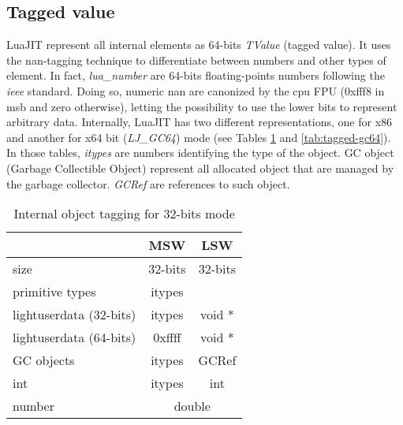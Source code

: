 

\subsection{Tagged value}
\label{Subsec:tagged-value}

LuaJIT represent all internal elements as 64-bits \emph{TValue} (tagged value).
It uses the nan-tagging technique to differentiate between numbers and other
types of element. In fact, \emph{lua\_number} are 64-bits floating-points numbers
following the \emph{ieee} standard. Doing so, numeric nan are canonized by the
cpu FPU (0xfff8 in msb and zero otherwise), letting the possibility to use the
lower bits to represent arbitrary data. Internally, LuaJIT has two different
representations, one for x86 and another for x64 bit (\emph{LJ\_GC64}) mode
(see Tables \ref{tab:tagged-gc32} and \ref{tab:tagged-gc64}). In those tables,
\emph{itypes} are numbers identifying the type of the object.
GC object (Garbage Collectible Object) represent all allocated object
that are managed by the garbage collector. \emph{GCRef} are references to such
object.

\begin{table}[H]
\centering
\caption{Internal object tagging for 32-bits mode}
\label{tab:tagged-gc32}
\begin{tabular}{l|c|c|c|}
\cline{2-4}
                                              & \multicolumn{2}{c|}{MSW}         & LSW         \\ \hline
\multicolumn{1}{|l|}{size}                    & \multicolumn{2}{c|}{32-bits}     & 32-bits     \\ \hline
\multicolumn{1}{|l|}{primitive types}         & \multicolumn{2}{c|}{itypes}      &             \\
\multicolumn{1}{|l|}{lightuserdata (32-bits)} & \multicolumn{2}{c|}{itypes}      & void *      \\
\multicolumn{1}{|l|}{lightuserdata (64-bits)} & 0xffff           & \multicolumn{2}{c|}{void *} \\
\multicolumn{1}{|l|}{GC objects}              & \multicolumn{2}{c|}{itypes}      & GCRef       \\
\multicolumn{1}{|l|}{int}                     & \multicolumn{2}{c|}{itypes}      & int         \\
\multicolumn{1}{|l|}{number}                  & \multicolumn{3}{c|}{double}                    \\ \hline
\end{tabular}
\end{table}

